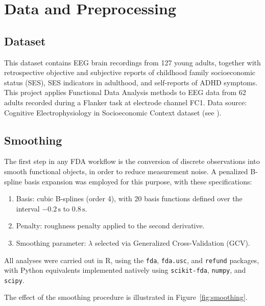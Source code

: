 \documentclass[twoside,11pt]{article}
\begin{document}
\section{Data and Preprocessing}

\subsection{Dataset}

This dataset contains EEG brain recordings from 127 young adults, together with retrospective
objective and subjective reports of childhood family socioeconomic status (SES), SES indicators in
adulthood, and self-reports of ADHD symptoms. This project applies Functional Data Analysis methods
to EEG data from 62 adults recorded during a Flanker task at electrode channel FC1. Data source:
Cognitive Electrophysiology in Socioeconomic Context dataset (see \cite{ds006018:1.2.2}).

\subsection{Smoothing}

The first step in any FDA workflow is the conversion of discrete observations into smooth functional
objects, in order to reduce measurement noise. A penalized B-spline basis expansion was employed for
this purpose, with these specifications:

\begin{enumerate}[
  itemsep=5pt,
  topsep=2pt,
  parsep=0pt,
  partopsep=0pt
]
  \item Basis: cubic B-splines (order 4), with 20 basis functions defined over the interval
    $-0.2\,\mathrm{s}$ to $0.8\,\mathrm{s}$.
  \item Penalty: roughness penalty applied to the second derivative.
  \item Smoothing parameter: $\lambda$ selected via Generalized Cross-Validation (GCV).
\end{enumerate}

All analyses were carried out in R, using the \texttt{fda}, \texttt{fda.usc}, and \texttt{refund}
packages, with Python equivalents implemented natively using \texttt{scikit-fda}, \texttt{numpy},
and \texttt{scipy}.

The effect of the smoothing procedure is illustrated in Figure~\ref{fig:smoothing}.
\end{document}

